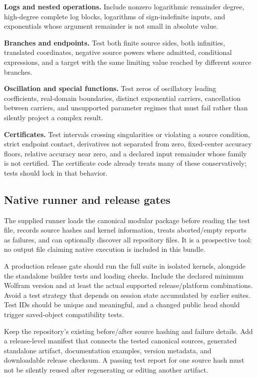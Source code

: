 \textbf{Logs and nested operations.} Include nonzero logarithmic remainder degree, high-degree complete log blocks, logarithms of sign-indefinite inputs, and exponentials whose argument remainder is not small in absolute value.

\textbf{Branches and endpoints.} Test both finite source sides, both infinities, translated coordinates, negative source powers where admitted, conditional expressions, and a target with the same limiting value reached by different source branches.

\textbf{Oscillation and special functions.} Test zeros of oscillatory leading coefficients, real-domain boundaries, distinct exponential carriers, cancellation between carriers, and unsupported parameter regimes that must fail rather than silently project a complex result.

\textbf{Certificates.} Test intervals crossing singularities or violating a source condition, strict endpoint contact, derivatives not separated from zero, fixed-center accuracy floors, relative accuracy near zero, and a declared input remainder whose family is not certified. The certificate code already treats many of these conservatively; tests should lock in that behavior.\cite{certificates}

\subsection{Native runner and release gates}
The supplied runner loads the canonical modular package before reading the test file, records source hashes and kernel information, treats aborted/empty reports as failures, and can optionally discover all repository  files. It is a prospective tool: no output file claiming native execution is included in this bundle.

A production release gate should run the full suite in isolated kernels, alongside the standalone builder tests and loading checks. Include the declared minimum Wolfram version and at least the actual supported release/platform combinations. Avoid a test strategy that depends on session state accumulated by earlier suites. Test IDs should be unique and meaningful, and a changed public head should trigger saved-object compatibility tests.

Keep the repository's existing before/after source hashing and failure details. Add a release-level manifest that connects the tested canonical sources, generated standalone artifact, documentation examples, version metadata, and downloadable release checksum. A passing test report for one source hash must not be silently reused after regenerating or editing another artifact.\cite{runner,development}

